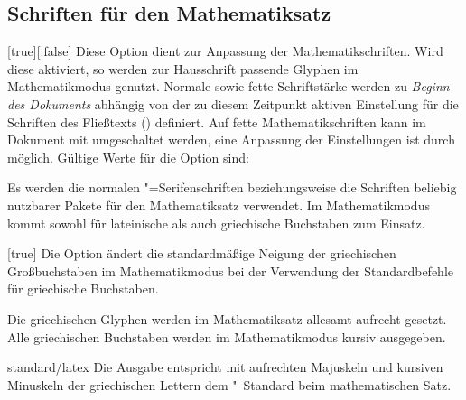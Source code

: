 \begin{Declaration*}{}
\begin{Declaration*}{}
\begin{Declaration*}{}
\subsection{Schriften für den Mathematiksatz}
%
%
%
\begin{Declaration}[v2.03]{}%
  [true][:false]
\printdeclarationlist%
%
Diese Option dient zur Anpassung der Mathematikschriften. Wird diese aktiviert, 
so werden zur Hausschrift passende Glyphen im Mathematikmodus genutzt. Normale 
sowie fette Schriftstärke werden zu \emph{Beginn des Dokuments} abhängig von 
der zu diesem Zeitpunkt aktiven Einstellung für die Schriften des Fließtexts 
() definiert. Auf fette Mathematikschriften kann im 
Dokument mit  umgeschaltet werden, eine Anpassung der 
Einstellungen ist durch  möglich. Gültige Werte für die 
Option  sind:
%
\begin{values}{}
\itemfalse
  Es werden die normalen "=Serifenschriften beziehungsweise die 
  Schriften beliebig nutzbarer Pakete für den Mathematiksatz verwendet.
\itemtrue*
  Im Mathematikmodus kommt \OpenSans sowohl für lateinische als auch 
  griechische Buchstaben zum Einsatz.
\end{values}
\end{Declaration}

\begin{Declaration}[%
  v2.06!\Option{slantedgreek=standard};
]{}[true]
\printdeclarationlist%
%
%
Die Option ändert die standardmäßige Neigung der griechischen Großbuchstaben im 
Mathematikmodus bei der Verwendung der Standardbefehle für griechische 
Buchstaben.
%
\begin{values}{}
\itemfalse
  Die griechischen Glyphen werden im Mathematiksatz allesamt aufrecht gesetzt.
\itemtrue*
  Alle griechischen Buchstaben werden im Mathematikmodus kursiv ausgegeben.
\item[standard/latex]
  Die Ausgabe entspricht mit aufrechten Majuskeln und kursiven Minuskeln der 
  griechischen Lettern dem "~Standard beim mathematischen Satz.
\end{values}
\end{Declaration}


\end{Declaration*}
\end{Declaration*}
\end{Declaration*}
